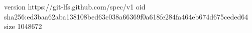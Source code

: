 version https://git-lfs.github.com/spec/v1
oid sha256:ed3baa62aba138108bed63c038a66369f0a618fe284fa464eb674d675ceded64
size 1048672
